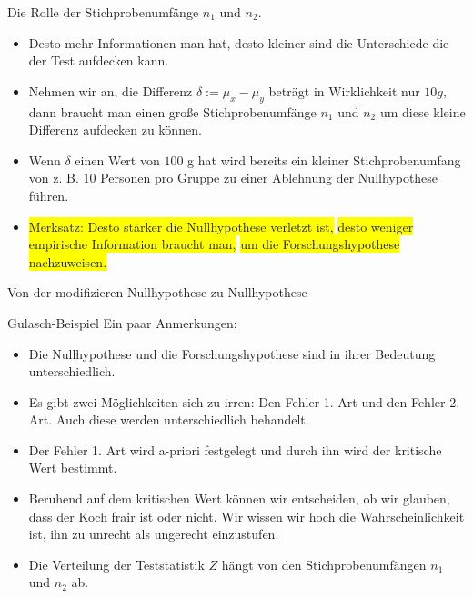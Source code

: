 \documentclass[usenames,dvipsnames,handout]{beamer}
\begin{document}
\begin{frame}{Die Rolle der Stichprobenumfänge $n_{1}$ und $n_{2}.$}
\begin{itemize}
\item{Desto mehr Informationen man hat, desto kleiner sind die Unterschiede die der Test aufdecken kann.}\pause
\item{Nehmen wir an, die Differenz $\delta := \mu_{x}-\mu_{y}$ beträgt in Wirklichkeit nur $10g,$ dann braucht man
einen große Stichprobenumfänge $n_{1}$ und $n_{2}$ um diese kleine Differenz aufdecken zu können.}\pause
\item{Wenn $\delta$ einen Wert von $100$ g hat wird bereits ein kleiner Stichprobenumfang von z. B. $10$
Personen pro Gruppe zu einer Ablehnung der Nullhypothese führen.}\pause
\item{\colorbox{yellow}{Merksatz: Desto stärker die Nullhypothese verletzt ist,} 
\colorbox{yellow}{desto weniger empirische Information braucht man,}
\colorbox{yellow}{um die Forschungshypothese nachzuweisen.}}
\end{itemize}
\end{frame}

\begin{frame}{Von der modifizieren Nullhypothese zu Nullhypothese}
\end{frame}



\begin{frame}{ Gulasch-Beispiel}
Ein paar Anmerkungen: 
\begin{itemize}
\item{Die Nullhypothese und die Forschungshypothese sind in ihrer Bedeutung unterschiedlich.}
\item{Es gibt zwei Möglichkeiten sich zu irren: Den Fehler 1. Art und den Fehler 2. Art. Auch diese werden unterschiedlich
behandelt.}
\item{Der Fehler 1. Art wird a-priori festgelegt und durch ihn wird der kritische Wert  bestimmt.}
\item{Beruhend auf dem kritischen Wert können wir entscheiden, ob wir glauben, dass der Koch frair ist oder nicht. Wir wissen 
wir hoch die Wahrscheinlichkeit ist, ihn zu unrecht als ungerecht einzustufen.}
\item{Die Verteilung der Teststatistik $Z$ hängt von den Stichprobenumfängen $n_{1}$ und $n_{2}$ ab.}
\end{itemize}
\end{frame}
\end{document}
